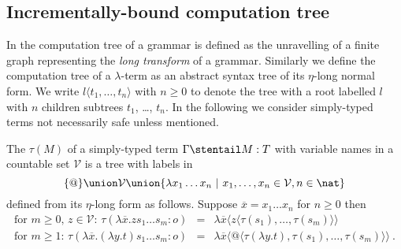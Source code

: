 \subsection*{Incrementally-bound computation tree}
 In \cite{OngLics2006} the computation tree of a grammar is
defined as the unravelling of a finite graph representing the \emph{long
transform} of a grammar. Similarly we define the computation tree of
a $\lambda$-term as an abstract syntax tree of its $\eta$-long
normal form.  We write $l\langle t_1, \ldots, t_n \rangle$ with $n
\geq 0$ to denote the tree with a root labelled $l$ with $n$
children subtrees $t_1$, \ldots, $t_n$. In the following we consider
simply-typed terms not necessarily safe unless mentioned.

\begin{definition}\rm
\label{dfn:comptree}
  The  $\tau(M)$ of a simply-typed term
  $\Gamma \stentail M:T$ with variable names in a countable set
  $\mathcal{V}$ is a tree with labels in $$ \{ @ \} \union \mathcal{V}
  \union \{ \lambda x_1 \ldots x_n \ | \ x_1 ,\ldots, x_n \in
  \mathcal{V}, n\in\nat \}$$ defined from its $\eta$-long form as follows. Suppose $\overline{x} = x_1 \ldots x_n$ for $n\geq 0$ then
\begin{eqnarray*}
  \mbox{for $m\geq 0$, $z \in \mathcal{V}$: } \tau(\lambda \overline{x} . z s_1 \ldots s_m : o) &=& \lambda \overline{x} \langle z \langle\tau(s_1),\ldots,\tau(s_m)\rangle\rangle \\
  \mbox{for $m \geq 1$: } \tau(\lambda \overline{x} . (\lambda y.t) s_1 \ldots s_m :o) &=& \lambda \overline{x} \langle @ \langle \tau(\lambda y.t),\tau(s_1),\ldots,\tau(s_m) \rangle \rangle \ .
\end{eqnarray*}
\end{definition}

